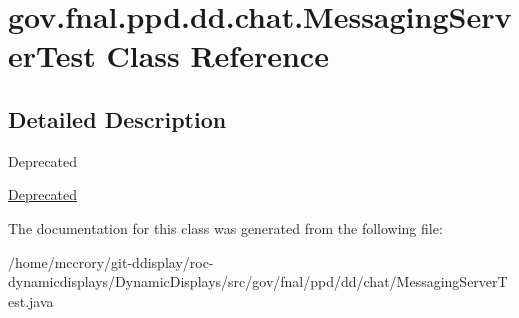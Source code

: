 \hypertarget{classgov_1_1fnal_1_1ppd_1_1dd_1_1chat_1_1MessagingServerTest}{\section{gov.\-fnal.\-ppd.\-dd.\-chat.\-Messaging\-Server\-Test Class Reference}
\label{classgov_1_1fnal_1_1ppd_1_1dd_1_1chat_1_1MessagingServerTest}
}


\subsection{Detailed Description}
\begin{DoxyRefDesc}{Deprecated}
\item[\hyperlink{deprecated__deprecated000002}{Deprecated}]\end{DoxyRefDesc}


The documentation for this class was generated from the following file\-:\begin{DoxyCompactItemize}
\item 
/home/mccrory/git-\/ddisplay/roc-\/dynamicdisplays/\-Dynamic\-Displays/src/gov/fnal/ppd/dd/chat/Messaging\-Server\-Test.\-java\end{DoxyCompactItemize}
